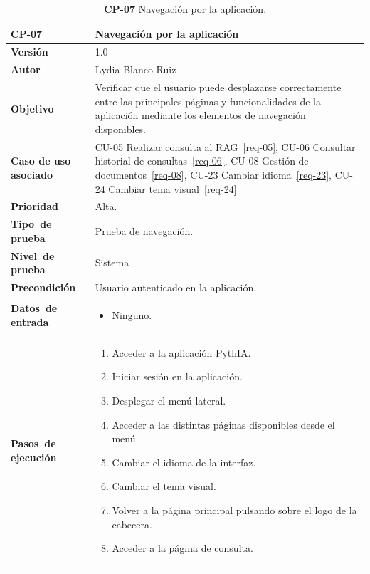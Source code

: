 \begin{table}[p]
	\centering
	\begin{tabularx}{\linewidth}{ p{} p{} }
		\toprule
		\textbf{CP-07}    & \textbf{Navegación por la aplicación}\\
		\toprule
		\textbf{Versión}              & 1.0    \\
		\textbf{Autor}                & Lydia Blanco Ruiz \\
		\textbf{Objetivo}			 & Verificar que el usuario puede desplazarse correctamente entre las principales páginas y funcionalidades de la aplicación mediante los elementos de navegación disponibles.\\
		\textbf{Caso de uso asociado} &  CU-05 Realizar consulta al RAG~\ref{req-05}, CU-06 Consultar historial de consultas~\ref{req-06}, CU-08 Gestión de documentos~\ref{req-08}, CU-23 Cambiar idioma~\ref{req-23}, CU-24 Cambiar tema visual~\ref{req-24}\\
		\textbf{Prioridad}          & Alta. \\
		\textbf{\mbox{Tipo de} \mbox{prueba}}         & Prueba de navegación. \\
		\textbf{\mbox{Nivel de} \mbox{prueba}}        & Sistema\\
		\textbf{Precondición}        & Usuario autenticado en la aplicación. \\
		\textbf{\mbox{Datos de} \mbox{entrada}} 		& 
		\begin{itemize}
		\tightlist
			\item Ninguno.
		\end{itemize}				
		\\
		\textbf{\mbox{Pasos de} \mbox{ejecución}}		&
		\begin{enumerate}
		\tightlist
			\item Acceder a la aplicación \eng{web} PythIA.
			\item Iniciar sesión en la aplicación.
			\item Desplegar el menú lateral.
			\item Acceder a las distintas páginas disponibles desde el menú.
			\item Cambiar el idioma de la interfaz.
			\item Cambiar el tema visual.
			\item Volver a la página principal pulsando sobre el logo de la cabecera.
			\item Acceder a la página de consulta.
		\end{enumerate} \\
		\bottomrule
	\end{tabularx}
	\caption{\textbf{CP-07} Navegación por la aplicación.}
	\label{prueb-07}
\end{table}

